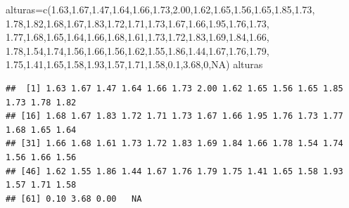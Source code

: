 \documentclass[
]{book}
\newenvironment{Shaded}{\begin{snugshade}}{\end{snugshade}}
\newcommand{\ConstantTok}[1]{\textcolor[rgb]{0.00,0.00,0.00}{#1}}
\newcommand{\DecValTok}[1]{\textcolor[rgb]{0.00,0.00,0.81}{#1}}
\newcommand{\FloatTok}[1]{\textcolor[rgb]{0.00,0.00,0.81}{#1}}
\newcommand{\FunctionTok}[1]{\textcolor[rgb]{0.00,0.00,0.00}{#1}}
\newcommand{\NormalTok}[1]{#1}
\newcommand{\OtherTok}[1]{\textcolor[rgb]{0.56,0.35,0.01}{#1}}
\begin{document}
\begin{Shaded}
\begin{Highlighting}[]
\NormalTok{alturas}\OtherTok{=}\FunctionTok{c}\NormalTok{(}\FloatTok{1.63}\NormalTok{,}\FloatTok{1.67}\NormalTok{,}\FloatTok{1.47}\NormalTok{,}\FloatTok{1.64}\NormalTok{,}\FloatTok{1.66}\NormalTok{,}\FloatTok{1.73}\NormalTok{,}\FloatTok{2.00}\NormalTok{,}\FloatTok{1.62}\NormalTok{,}\FloatTok{1.65}\NormalTok{,}\FloatTok{1.56}\NormalTok{,}\FloatTok{1.65}\NormalTok{,}\FloatTok{1.85}\NormalTok{,}\FloatTok{1.73}\NormalTok{,}
          \FloatTok{1.78}\NormalTok{,}\FloatTok{1.82}\NormalTok{,}\FloatTok{1.68}\NormalTok{,}\FloatTok{1.67}\NormalTok{,}\FloatTok{1.83}\NormalTok{,}\FloatTok{1.72}\NormalTok{,}\FloatTok{1.71}\NormalTok{,}\FloatTok{1.73}\NormalTok{,}\FloatTok{1.67}\NormalTok{,}\FloatTok{1.66}\NormalTok{,}\FloatTok{1.95}\NormalTok{,}\FloatTok{1.76}\NormalTok{,}\FloatTok{1.73}\NormalTok{,}
          \FloatTok{1.77}\NormalTok{,}\FloatTok{1.68}\NormalTok{,}\FloatTok{1.65}\NormalTok{,}\FloatTok{1.64}\NormalTok{,}\FloatTok{1.66}\NormalTok{,}\FloatTok{1.68}\NormalTok{,}\FloatTok{1.61}\NormalTok{,}\FloatTok{1.73}\NormalTok{,}\FloatTok{1.72}\NormalTok{,}\FloatTok{1.83}\NormalTok{,}\FloatTok{1.69}\NormalTok{,}\FloatTok{1.84}\NormalTok{,}\FloatTok{1.66}\NormalTok{,}
          \FloatTok{1.78}\NormalTok{,}\FloatTok{1.54}\NormalTok{,}\FloatTok{1.74}\NormalTok{,}\FloatTok{1.56}\NormalTok{,}\FloatTok{1.66}\NormalTok{,}\FloatTok{1.56}\NormalTok{,}\FloatTok{1.62}\NormalTok{,}\FloatTok{1.55}\NormalTok{,}\FloatTok{1.86}\NormalTok{,}\FloatTok{1.44}\NormalTok{,}\FloatTok{1.67}\NormalTok{,}\FloatTok{1.76}\NormalTok{,}\FloatTok{1.79}\NormalTok{,}
          \FloatTok{1.75}\NormalTok{,}\FloatTok{1.41}\NormalTok{,}\FloatTok{1.65}\NormalTok{,}\FloatTok{1.58}\NormalTok{,}\FloatTok{1.93}\NormalTok{,}\FloatTok{1.57}\NormalTok{,}\FloatTok{1.71}\NormalTok{,}\FloatTok{1.58}\NormalTok{,}\FloatTok{0.1}\NormalTok{,}\FloatTok{3.68}\NormalTok{,}\DecValTok{0}\NormalTok{,}\ConstantTok{NA}\NormalTok{)}
\NormalTok{alturas}
\end{Highlighting}
\end{Shaded}

\begin{verbatim}
##  [1] 1.63 1.67 1.47 1.64 1.66 1.73 2.00 1.62 1.65 1.56 1.65 1.85 1.73 1.78 1.82
## [16] 1.68 1.67 1.83 1.72 1.71 1.73 1.67 1.66 1.95 1.76 1.73 1.77 1.68 1.65 1.64
## [31] 1.66 1.68 1.61 1.73 1.72 1.83 1.69 1.84 1.66 1.78 1.54 1.74 1.56 1.66 1.56
## [46] 1.62 1.55 1.86 1.44 1.67 1.76 1.79 1.75 1.41 1.65 1.58 1.93 1.57 1.71 1.58
## [61] 0.10 3.68 0.00   NA
\end{verbatim}
\end{document}
